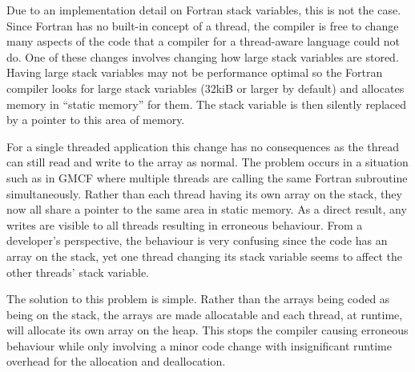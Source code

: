Due to an implementation detail on Fortran stack variables, this is not the
case. Since Fortran has no built-in concept of a thread, the compiler is free to
change many aspects of the code that a compiler for a thread-aware language
could not do. One of these changes involves changing how large stack variables
are stored. Having large stack variables may not be performance optimal so the
Fortran compiler looks for large stack variables (32kiB or larger by default)
and allocates memory in ``static memory'' for them. The stack variable is then
silently replaced by a pointer to this area of memory.

For a single threaded application this change has no consequences as the thread
can still read and write to the array as normal. The problem occurs in a
situation such as in GMCF where multiple threads are calling the same Fortran
subroutine simultaneously. Rather than each thread having its own array on the
stack, they now all share a pointer to the same area in static memory. As a
direct result, any writes are visible to all threads resulting in erroneous
behaviour. From a developer's perspective, the behaviour is very confusing since
the code has an array on the stack, yet one thread changing its stack variable
seems to affect the other threads' stack variable.

The solution to this problem is simple. Rather than the arrays being coded as
being on the stack, the arrays are made allocatable and each thread, at runtime,
will allocate its own array on the heap. This stops the compiler causing
erroneous behaviour while only involving a minor code change with insignificant
runtime overhead for the allocation and deallocation.
